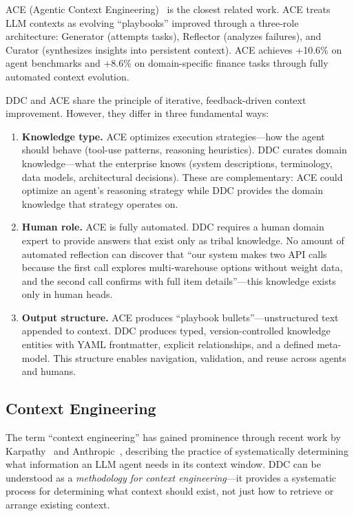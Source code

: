 \documentclass[11pt,a4paper]{article}
\begin{document}
ACE (Agentic Context Engineering)~\citep{zhang2025ace} is the closest related work. ACE treats LLM contexts as evolving ``playbooks'' improved through a three-role architecture: Generator (attempts tasks), Reflector (analyzes failures), and Curator (synthesizes insights into persistent context). ACE achieves +10.6\% on agent benchmarks and +8.6\% on domain-specific finance tasks through fully automated context evolution.

DDC and ACE share the principle of iterative, feedback-driven context improvement. However, they differ in three fundamental ways:

\begin{enumerate}
  \item \textbf{Knowledge type.} ACE optimizes execution strategies---how the agent should behave (tool-use patterns, reasoning heuristics). DDC curates domain knowledge---what the enterprise knows (system descriptions, terminology, data models, architectural decisions). These are complementary: ACE could optimize an agent's reasoning strategy while DDC provides the domain knowledge that strategy operates on.

  \item \textbf{Human role.} ACE is fully automated. DDC requires a human domain expert to provide answers that exist only as tribal knowledge. No amount of automated reflection can discover that ``our system makes two API calls because the first call explores multi-warehouse options without weight data, and the second call confirms with full item details''---this knowledge exists only in human heads.

  \item \textbf{Output structure.} ACE produces ``playbook bullets''---unstructured text appended to context. DDC produces typed, version-controlled knowledge entities with YAML frontmatter, explicit relationships, and a defined meta-model. This structure enables navigation, validation, and reuse across agents and humans.
\end{enumerate}

\subsection{Context Engineering}

The term ``context engineering'' has gained prominence through recent work by Karpathy~\citep{karpathy2025context} and Anthropic~\citep{anthropic2025agents}, describing the practice of systematically determining what information an LLM agent needs in its context window. DDC can be understood as a \emph{methodology for context engineering}---it provides a systematic process for determining what context should exist, not just how to retrieve or arrange existing context.
\end{document}
